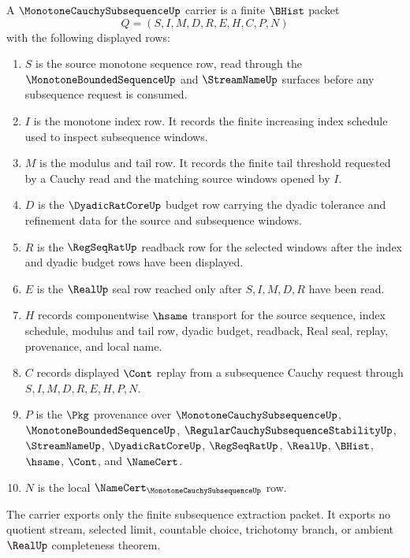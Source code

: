 \begin{definition}
\label{def:monotone-cauchy-subsequence-carrier}
A $\MonotoneCauchySubsequenceUp$ carrier is a finite $\BHist$ packet
$$
Q=(S,I,M,D,R,E,H,C,P,N)
$$
with the following displayed rows:
\begin{enumerate}
\item $S$ is the source monotone sequence row, read through the $\MonotoneBoundedSequenceUp$ and $\StreamNameUp$ surfaces before any subsequence request is consumed.
\item $I$ is the monotone index row. It records the finite increasing index schedule used to inspect subsequence windows.
\item $M$ is the modulus and tail row. It records the finite tail threshold requested by a Cauchy read and the matching source windows opened by $I$.
\item $D$ is the $\DyadicRatCoreUp$ budget row carrying the dyadic tolerance and refinement data for the source and subsequence windows.
\item $R$ is the $\RegSeqRatUp$ readback row for the selected windows after the index and dyadic budget rows have been displayed.
\item $E$ is the $\RealUp$ seal row reached only after $S,I,M,D,R$ have been read.
\item $H$ records componentwise $\hsame$ transport for the source sequence, index schedule, modulus and tail row, dyadic budget, readback, Real seal, replay, provenance, and local name.
\item $C$ records displayed $\Cont$ replay from a subsequence Cauchy request through $S,I,M,D,R,E,H,P,N$.
\item $P$ is the $\Pkg$ provenance over $\MonotoneCauchySubsequenceUp$, $\MonotoneBoundedSequenceUp$, $\RegularCauchySubsequenceStabilityUp$, $\StreamNameUp$, $\DyadicRatCoreUp$, $\RegSeqRatUp$, $\RealUp$, $\BHist$, $\hsame$, $\Cont$, and $\NameCert$.
\item $N$ is the local $\NameCert_{\MonotoneCauchySubsequenceUp}$ row.
\end{enumerate}
The carrier exports only the finite subsequence extraction packet. It exports no quotient stream, selected limit, countable choice, trichotomy branch, or ambient $\RealUp$ completeness theorem.
\end{definition}


